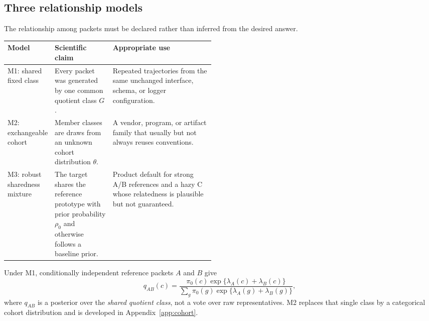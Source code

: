 \documentclass[11pt]{article}
\begin{document}
    \subsection{Three relationship models}

    The relationship among packets must be declared rather than inferred from the desired
    answer.
    \begin{center}
        \small
        \begin{tabularx}{\linewidth}{@{}>{\raggedright\arraybackslash}p{0.19\linewidth}>{\raggedright\arraybackslash}p{0.29\linewidth}Y@{}}
\toprule
Model & Scientific claim & Appropriate use \\
\midrule
M1: shared fixed class
& Every packet was generated by one common quotient class $G$.
& Repeated trajectories from the same unchanged interface, schema, or logger configuration. \\
M2: exchangeable cohort
& Member classes are draws from an unknown cohort distribution $\theta$.
& A vendor, program, or artifact family that usually but not always reuses conventions. \\
M3: robust sharedness mixture
& The target shares the reference prototype with prior probability $\rho_0$ and otherwise follows a baseline prior.
& Product default for strong A/B references and a hazy C whose relatedness is plausible but not guaranteed. \\
\bottomrule
        \end{tabularx}
    \end{center}

    Under M1, conditionally independent reference packets $A$ and $B$ give
    \begin{equation}
        q_{AB}(c)
        =\frac{\pi_0(c)\exp\{\lambda_A(c)+\lambda_B(c)\}}
        {\sum_g\pi_0(g)\exp\{\lambda_A(g)+\lambda_B(g)\}},
        \label{eq:cohort-prototype}
    \end{equation}
    where $q_{AB}$ is a posterior over the \emph{shared quotient class}, not a vote over raw
    representatives. M2 replaces that single class by a categorical cohort distribution and
    is developed in Appendix~\ref{app:cohort}.
\end{document}
